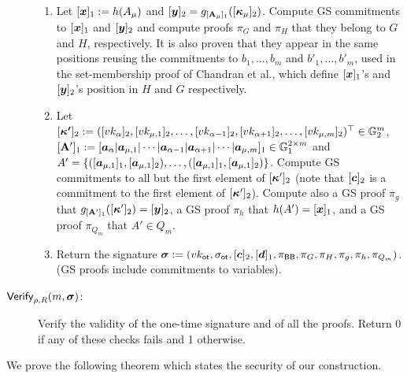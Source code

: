 \begin{description}
\begin{enumerate}
\item Let $[{\boldsymbol{x}}]_1:=h(A_\mu)$ and $[{\boldsymbol{y}}]_2=g_{[\mathbf{{A}}_\mu]_1}([{\boldsymbol{\kappa}}_\mu]_2)$. Compute GS commitments to $[{\boldsymbol{x}}]_1$ and $[{\boldsymbol{y}}]_2$ and compute proofs $\pi_G$ and $\pi_H$ that they belong to $G$ and $H$, respectively. It is also proven that they appear in the same positions reusing the commitments to $b_1,\ldots,b_{m}$ and $b'_1,\ldots,b'_{m}$, used in the set-membership proof of Chandran et al., which define $[{\boldsymbol{x}}]_1$'s and $[{\boldsymbol{y}}]_2$'s position in $H$ and $G$ respectively.

\item Let
$
[{\boldsymbol{\kappa'}}]_2:=([vk_\alpha]_2,[vk_{\mu,1}]_2,\ldots,[vk_{\alpha-1}]_2,[vk_{\alpha+1}]_2,\ldots,[vk_{\mu,m}]_2)^\top\in\mathbb{G}^m_2$, 
$[\mathbf{{A}}']_1:=[{\boldsymbol{a}}_\alpha | {\boldsymbol{a}}_{\mu,1} | \cdots | {\boldsymbol{a}}_{\alpha-1}| {\boldsymbol{a}}_{\alpha+1}|\cdots|{\boldsymbol{a}}_{\mu,m}]_1\in\mathbb{G}^{2\times m}_1$ and
$A'=\{([{\boldsymbol{a}}_{\mu,1}]_1,[{\boldsymbol{a}}_{\mu,1}]_2),\ldots,([{\boldsymbol{a}}_{\mu,1}]_1,\allowbreak [{\boldsymbol{a}}_{\mu,1}]_2)\}$.
Compute GS commitments to all but the first element of $[{\boldsymbol{\kappa}}']_2$ (note that $[{\boldsymbol{c}}]_2$ is a commitment to the first element of $[{\boldsymbol{\kappa}}']_2$). Compute also a GS proof $\pi_g$ that $g_{[\mathbf{{A}}']_1}([{\boldsymbol{\kappa}}']_2)=[{\boldsymbol{y}}]_2$, a GS proof $\pi_{h}$ that $h(A')=[{\boldsymbol{x}}]_1$, and a GS proof $\pi_{Q_m}$ that $A'\in Q_m$.

\item Return the signature ${\boldsymbol \sigma}:=(vk_\mathsf{ot},\sigma_\mathsf{ot},[{\boldsymbol{c}}]_2,[{\boldsymbol{d}}]_1,\pi_{\mathsf{BB}},\pi_G,\pi_H, \pi_g,\pi_h,\pi_{Q_m})$. (GS proofs include commitments to variables).
\end{enumerate}

\item[$\mathsf{Verify}_{\rho,R}(m,{\boldsymbol \sigma})$:] Verify the validity of the one-time signature and of all the proofs. Return 0 if any of these checks fails and 1 otherwise.
\end{description}

We prove the following theorem which states the security of our construction.

